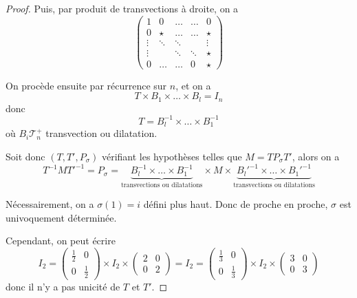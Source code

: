 \documentclass[12pt]{article}
\begin{document}
\begin{proof}
    Puis, par produit de transvections à droite, on a 
    \begin{equation}
        \begin{pmatrix}
            1&0 &\dots & \dots& 0\\
            0 & \star & \dots &\dots & \star\\
            \vdots & \ddots & \ddots &  & \vdots\\
            \vdots & & \ddots & \ddots & \star\\
            0 &\dots & \dots & 0 & \star
        \end{pmatrix}
    \end{equation}

    On procède ensuite par récurrence sur $n$, et on a 
    \begin{equation}
        T\times B_{1}\times\dots\times B_{l}=I_{n}
    \end{equation}
    donc 
    \begin{equation}
        T=B_{l}^{-1}\times\dots\times B_{1}^{-1}
    \end{equation}
    où $B_{i}\mathcal{T}_{n}^{+}$ transvection ou dilatation.

    Soit donc $(T,T',P_{\sigma})$ vérifiant les hypothèses telles que $M=TP_{\sigma}T'$, alors on a 
    \begin{equation}
        T^{-1}MT'^{-1}=P_{\sigma}=\underbrace{B_{l}^{-1}\times\dots\times B_{1}^{-1}}_{\text{transvections ou dilatations}}\times M\times\underbrace{B_{l}'^{-1}\times\dots\times B_{1}'^{-1}}_{\text{transvections ou dilatations}}
    \end{equation}

    Nécessairement, on a  $\sigma(1)=i$ défini plus haut. Donc de proche en proche, $\sigma$ est univoquement déterminée.

    Cependant, on peut écrire
    \begin{equation}
        I_{2}=
        \begin{pmatrix}
        \frac{1}{2}&0\\
        0&\frac{1}{2}    
        \end{pmatrix}\times I_{2}\times
        \begin{pmatrix}
            2&0\\
            0&2    
        \end{pmatrix}
        =
        I_{2}=
        \begin{pmatrix}
        \frac{1}{3}&0\\
        0&\frac{1}{3}    
        \end{pmatrix}\times I_{2}\times
        \begin{pmatrix}
            3&0\\
            0&3    
        \end{pmatrix}
    \end{equation}
    donc il n'y a pas unicité de $T$ et $T'$.
\end{proof}
\end{document}
